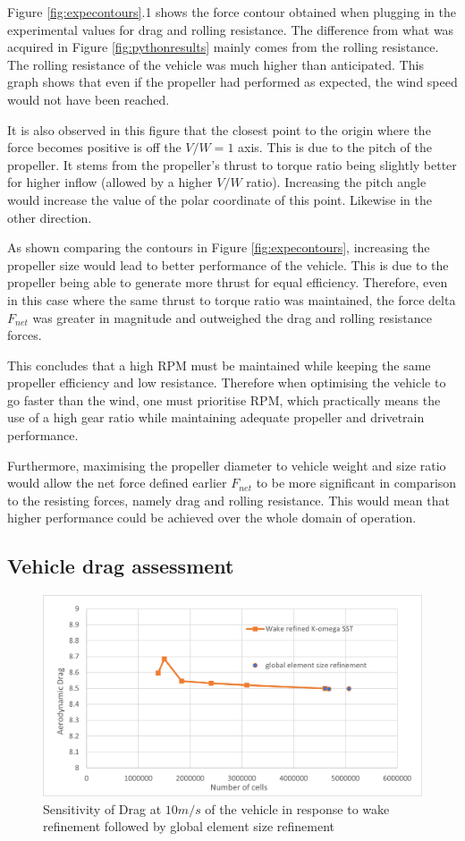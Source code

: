 Figure \ref{fig:expecontours}.1 shows the force contour obtained when plugging in the experimental values for drag and rolling resistance. The difference from what was acquired in Figure \ref{fig:pythonresults} mainly comes from the rolling resistance. The rolling resistance of the vehicle was much higher than anticipated. This graph shows that even if the propeller had performed as expected, the wind speed would not have been reached. 

It is also observed in this figure that the closest point to the origin where the force becomes positive is off the $V/W=1$ axis. This is due to the pitch of the propeller. It stems from the propeller’s thrust to torque ratio being slightly better for higher inflow (allowed by a higher $V/W$ ratio). Increasing the pitch angle would increase the value of the polar coordinate of this point. Likewise in the other direction.

As shown comparing the contours in Figure \ref{fig:expecontours}, increasing the propeller size would lead to better performance of the vehicle. This is due to the propeller being able to generate more thrust for equal efficiency. Therefore, even in this case where the same thrust to torque ratio was maintained, the force delta $F_{net}$ was greater in magnitude and outweighed the drag and rolling resistance forces.

This concludes that a high RPM must be maintained while keeping the same propeller efficiency and low resistance. Therefore when optimising the vehicle to go faster than the wind, one must prioritise RPM, which practically means the use of a high gear ratio while maintaining adequate propeller and drivetrain performance. 

Furthermore, maximising the propeller diameter to vehicle weight and size ratio would allow the net force defined earlier $F_{net}$ to be more significant in comparison to the resisting forces, namely drag and rolling resistance. This would mean that higher performance could be achieved over the whole domain of operation.


\subsection{Vehicle drag assessment}

\begin{figure}[!htbp]
    \centering
    \includegraphics[width=0.8\linewidth]{images/part10.1/dragncells.png}
    \caption{Sensitivity of Drag at $10m/s$ of the vehicle in response to wake refinement followed by global element size refinement}
    \label{fig:dragncells}
\end{figure}

